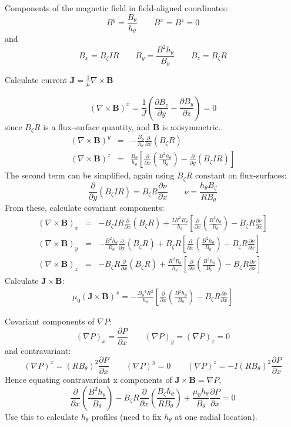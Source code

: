\documentclass[12pt, a4paper]{article}
\newcommand{\deriv}[2]{\ensuremath{\frac{\partial #1}{\partial #2}}}
\newcommand{\hthe}{\ensuremath{h_\theta}}
\newcommand{\Bp}{\ensuremath{B_\theta}}
\newcommand{\Bt}{\ensuremath{B_\zeta}}
\newcommand{\Vec}[1]{\ensuremath{\mathbf{#1}}}
\newcommand{\Bvec}{\Vec{B}}
\newcommand{\Jvec}{\Vec{J}}
\newcommand{\Curl}[1]{\ensuremath{\nabla\times #1 }}
\newcommand{\rbp}{\ensuremath{R\Bp}}
\newcommand{\rbpsq}{\ensuremath{\left(\rbp\right)^2}}
\begin{document}
Components of the magnetic field in field-aligned coordinates:
\[
B^y = \frac{\Bp}{\hthe} \qquad B^x = B^z = 0
\]
and
\[
B_x = \Bt I R \qquad B_y = \frac{B^2\hthe}{\Bp} \qquad B_z = \Bt R
\]

Calculate current $\Jvec = \frac{1}{\mu}\Curl{\Bvec}$

\[
\left(\Curl{\Bvec}\right)^x = \frac{1}{J}\left(\deriv{B_z}{y} - \deriv{B_y}{z}\right) = 0
\]
since $\Bt R$ is a flux-surface quantity, and $\Bvec$ is axisymmetric.
\begin{eqnarray*}
\left(\Curl{\Bvec}\right)^y &=& -\frac{\Bp}{\hthe}\deriv{}{x}\left(\Bt R\right) \\
\left(\Curl{\Bvec}\right)^z &=& \frac{\Bp}{\hthe}\left[\deriv{}{x}\left(\frac{B^2\hthe}{\Bp}\right) - \deriv{}{y}\left(\Bt I R\right)\right]
\end{eqnarray*}
The second term can be simplified, again using $\Bt R$ constant on flux-surfaces:
\[
\deriv{}{y}\left(\Bt I R\right) = \Bt R\deriv{\nu}{x} \qquad \nu = \frac{\hthe\Bt}{R\Bp}
\]
From these, calculate covariant components:
\begin{eqnarray}
\left(\Curl{\Bvec}\right)_x &=& -\Bt I R \deriv{}{x}\left(\Bt R\right) + \frac{IR^2\Bp}{\hthe}\left[\deriv{}{x}\left(\frac{B^2\hthe}{\Bp}\right) - \Bt R\deriv{\nu}{x}\right] \nonumber\\
\left(\Curl{\Bvec}\right)_y &=& -\frac{B^2\hthe}{\Bp}\deriv{}{x}\left(\Bt R\right) + \Bt R\left[\deriv{}{x}\left(\frac{B^2\hthe}{\Bp}\right) - \Bt R\deriv{\nu}{x}\right] \label{eq:curlb_y}\\
\left(\Curl{\Bvec}\right)_z &=& -\Bt R\deriv{}{x}\left(\Bt R\right) + \frac{R^2\Bp}{\hthe}\left[\deriv{}{x}\left(\frac{B^2\hthe}{\Bp}\right) - \Bt R\deriv{\nu}{x}\right] \nonumber
\end{eqnarray}
Calculate $\Jvec\times\Bvec$:
\begin{eqnarray*}
\mu_0 \left(\Jvec\times\Bvec\right)^x = -\frac{\Bp^3 R^2}{\hthe}\left[\deriv{}{x}\left(\frac{B^2\hthe}{\Bp}\right) - \Bt R\deriv{\nu}{x}\right]
\end{eqnarray*}

Covariant components of $\nabla P$:
\[
\left(\nabla P\right)_x = \deriv{P}{x} \qquad \left(\nabla P\right)_y = \left(\nabla P\right)_z = 0
\]
and contravariant:
\[
\left(\nabla P\right)^x = \rbpsq\deriv{P}{x} \qquad \left(\nabla P\right)^y = 0 \qquad \left(\nabla P\right)^z = -I\rbpsq\deriv{P}{x}
\]
Hence equating contravariant x components of $\Jvec\times\Bvec = \nabla P$,
\begin{equation}
\deriv{}{x}\left(\frac{B^2\hthe}{\Bp}\right) - \Bt R\deriv{}{x}\left(\frac{\Bt\hthe}{R\Bp}\right) + \frac{\mu_0\hthe}{\Bp}\deriv{P}{x} = 0
\label{eq:xbalance}
\end{equation}
Use this to calculate $\hthe$ profiles (need to fix $\hthe$ at one radial location).
\end{document}

